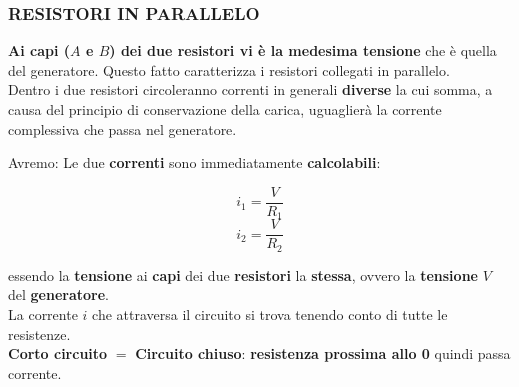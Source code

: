 \documentclass{article}
\begin{document}
\subsubsection{RESISTORI IN PARALLELO}


\textbf{Ai capi ($A$ e $B$) dei due resistori vi è la medesima tensione} che è quella del generatore. Questo fatto caratterizza i resistori collegati in parallelo.\\
Dentro i due resistori circoleranno correnti in generali \textbf{diverse} la cui somma, a causa del principio di conservazione della carica, uguaglierà la corrente complessiva che passa nel generatore.

Avremo: 
Le due \textbf{correnti} sono immediatamente \textbf{calcolabili}:

\begin{equation}
  i_1=\frac{V}{R_1}
\end{equation}
\begin{equation}
  i_2=\frac{V}{R_2}
\end{equation}

essendo la \textbf{tensione} ai \textbf{capi} dei due \textbf{resistori} la \textbf{stessa}, ovvero la \textbf{tensione} $V$ del \textbf{generatore}.\\
La corrente $i$ che attraversa il circuito si trova tenendo conto di tutte le resistenze. \\
\textbf{Corto circuito} $=$ \textbf{Circuito chiuso}: \textbf{resistenza prossima allo 0} quindi passa corrente.\\



\end{document}
